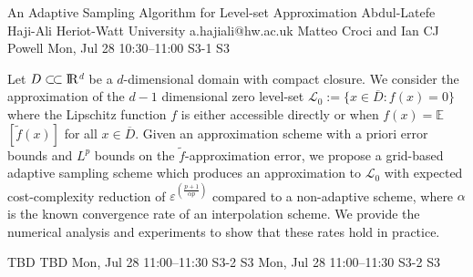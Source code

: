 \begin{talk}
  {An Adaptive Sampling Algorithm for Level-set Approximation}%
  {Abdul-Latefe Haji-Ali}%
  {Heriot-Watt University}%
  {a.hajiali@hw.ac.uk}%
  {Matteo Croci and Ian CJ Powell}%
  {}%
  {Mon, Jul 28 10:30–11:00}%
  {S3-1}%
  {S3}%
  {}%
				

  Let $D\subset\joinrel\subset\rm{I\!R}$$^d$ be a $d$-dimensional domain with compact
closure. We consider the approximation of the $d-1$ dimensional zero level-set
$\mathcal{L}_0 := \{x \in \overline{D} : f(x) = 0\}$ where the Lipschitz function $f$ is either
accessible directly or when $f(x) = \mathbb{E}$$\left[\tilde{f}(x)\right]$ for
all $x \in \overline{D}$. Given an approximation scheme with a priori error bounds
and $L^p$ bounds on the $\tilde{f}$-approximation error, we propose a
grid-based adaptive sampling scheme which produces an approximation to $\mathcal{L}_0$
with expected cost-complexity reduction of $\varepsilon^{\left(\frac{p+1}{\alpha p}\right)}$
compared to a non-adaptive scheme, where $\alpha$ is the known convergence rate of
an interpolation scheme. We provide the numerical analysis and experiments to
show that these rates hold in practice.

\medskip


\end{talk}

\begin{talk}
  {TBD}%
  {TBD}%
  {Mon, Jul 28 11:00–11:30}%
  {S3-2}%
  {S3}%
  {}%
  {Mon, Jul 28 11:00–11:30}%
  {S3-2}%
  {S3}%
\end{talk}

